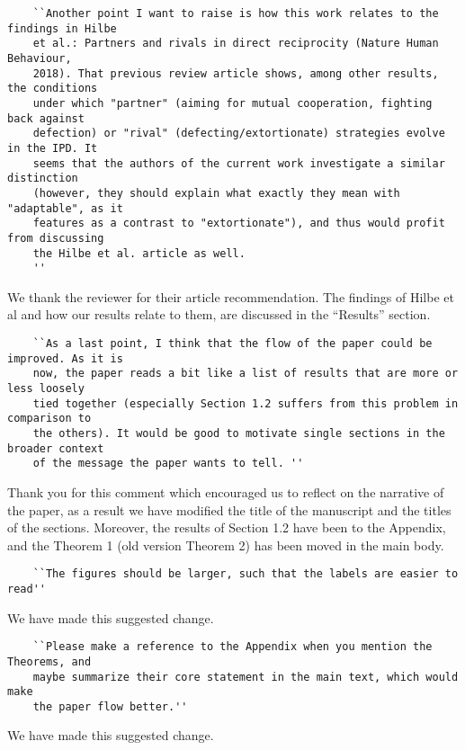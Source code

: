 \documentclass{article}
\begin{document}
\begin{verbatim}
    ``Another point I want to raise is how this work relates to the findings in Hilbe
    et al.: Partners and rivals in direct reciprocity (Nature Human Behaviour,
    2018). That previous review article shows, among other results, the conditions
    under which "partner" (aiming for mutual cooperation, fighting back against
    defection) or "rival" (defecting/extortionate) strategies evolve in the IPD. It
    seems that the authors of the current work investigate a similar distinction
    (however, they should explain what exactly they mean with "adaptable", as it
    features as a contrast to "extortionate"), and thus would profit from discussing
    the Hilbe et al. article as well.
    ''
\end{verbatim}

We thank the reviewer for their article recommendation. The findings of Hilbe et
 al and how our results relate to them, are discussed in the ``Results'' section.

\begin{verbatim}
    ``As a last point, I think that the flow of the paper could be improved. As it is
    now, the paper reads a bit like a list of results that are more or less loosely
    tied together (especially Section 1.2 suffers from this problem in comparison to
    the others). It would be good to motivate single sections in the broader context
    of the message the paper wants to tell. ''
\end{verbatim}

Thank you for this comment which encouraged us to reflect on the narrative of the
paper, as a result we have modified the title of the manuscript and the titles
of the sections. Moreover, the results of Section 1.2 have been to the Appendix,
and the Theorem 1 (old version Theorem 2) has been moved in the main body.

\begin{verbatim}
    ``The figures should be larger, such that the labels are easier to read''
\end{verbatim}

We have made this suggested change.

\begin{verbatim}
    ``Please make a reference to the Appendix when you mention the Theorems, and
    maybe summarize their core statement in the main text, which would make
    the paper flow better.''
\end{verbatim}

We have made this suggested change.
\end{document}
